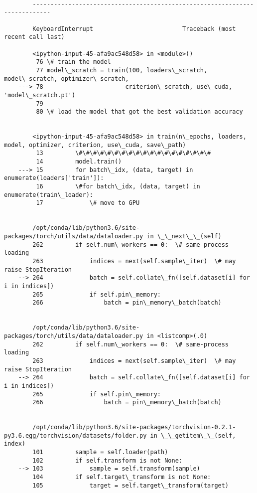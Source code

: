 \documentclass[11pt]{article}
\begin{document}
    \begin{Verbatim}[commandchars=\\\{\}]

        ---------------------------------------------------------------------------

        KeyboardInterrupt                         Traceback (most recent call last)

        <ipython-input-45-afa9ac548d58> in <module>()
         76 \# train the model
         77 model\_scratch = train(100, loaders\_scratch, model\_scratch, optimizer\_scratch, 
    ---> 78                       criterion\_scratch, use\_cuda, 'model\_scratch.pt')
         79 
         80 \# load the model that got the best validation accuracy


        <ipython-input-45-afa9ac548d58> in train(n\_epochs, loaders, model, optimizer, criterion, use\_cuda, save\_path)
         13         \#\#\#\#\#\#\#\#\#\#\#\#\#\#\#\#\#\#\#
         14         model.train()
    ---> 15         for batch\_idx, (data, target) in enumerate(loaders['train']):
         16         \#for batch\_idx, (data, target) in enumerate(train\_loader):
         17             \# move to GPU


        /opt/conda/lib/python3.6/site-packages/torch/utils/data/dataloader.py in \_\_next\_\_(self)
        262         if self.num\_workers == 0:  \# same-process loading
        263             indices = next(self.sample\_iter)  \# may raise StopIteration
    --> 264             batch = self.collate\_fn([self.dataset[i] for i in indices])
        265             if self.pin\_memory:
        266                 batch = pin\_memory\_batch(batch)


        /opt/conda/lib/python3.6/site-packages/torch/utils/data/dataloader.py in <listcomp>(.0)
        262         if self.num\_workers == 0:  \# same-process loading
        263             indices = next(self.sample\_iter)  \# may raise StopIteration
    --> 264             batch = self.collate\_fn([self.dataset[i] for i in indices])
        265             if self.pin\_memory:
        266                 batch = pin\_memory\_batch(batch)


        /opt/conda/lib/python3.6/site-packages/torchvision-0.2.1-py3.6.egg/torchvision/datasets/folder.py in \_\_getitem\_\_(self, index)
        101         sample = self.loader(path)
        102         if self.transform is not None:
    --> 103             sample = self.transform(sample)
        104         if self.target\_transform is not None:
        105             target = self.target\_transform(target)



\end{Verbatim}
\end{document}
